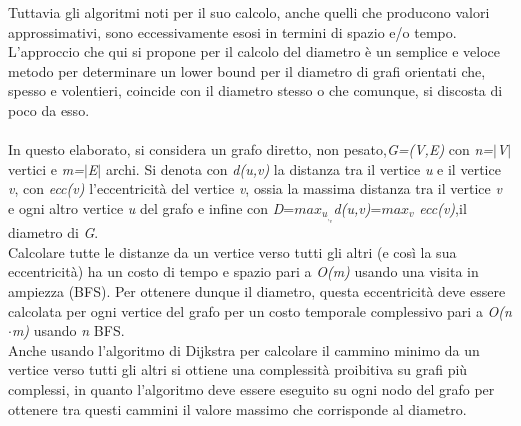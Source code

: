 \documentclass[twoside,openright,titlepage,fleqn,
	headinclude,11pt,a4paper,BCOR5mm,footinclude,pdftex
	]{scrbook}
\begin{document}
Tuttavia gli algoritmi noti per il suo calcolo, anche quelli che producono valori approssimativi, sono eccessivamente esosi in termini di spazio e/o tempo.\\
L'approccio che qui si propone per il calcolo del diametro è un semplice e veloce metodo per determinare un lower bound per il diametro di grafi orientati che, spesso e volentieri, coincide con il diametro stesso o che comunque, si discosta di poco da esso.\\
\\
In questo elaborato, si considera un grafo diretto, non pesato,\textit{G=(V,E)} con \textit{n=$\mid $V$\mid $} vertici  e \textit{m=$\mid$E$\mid$} archi.
Si denota con \textit{d(u,v)} la distanza tra il vertice \textit{u} e il vertice \textit{v}, con \textit{ecc(v)} l'eccentricità del vertice \textit{v}, ossia la massima distanza tra il vertice \textit{v} e ogni altro vertice \textit{u} del grafo e infine con \textit{D}=$max_u_,_v  $\textit{d(u,v)}=$max_v$ \textit{ecc(v)},il diametro di \textit{G}.\\
Calcolare tutte le distanze da un vertice verso tutti gli altri (e così la sua eccentricità) ha un costo di tempo e spazio pari a \textit{O(m)} usando una visita in ampiezza (BFS). Per ottenere dunque il diametro, questa eccentricità deve essere calcolata per ogni vertice del grafo per un costo temporale complessivo pari a \textit{O(n$\cdot $m)} usando \textit{n} BFS.\\Anche usando l'algoritmo di Dijkstra per calcolare il cammino minimo da un vertice verso tutti gli altri si ottiene una complessità proibitiva su grafi più complessi, in quanto l'algoritmo deve essere eseguito su ogni nodo del grafo per ottenere tra questi cammini il valore massimo che corrisponde al diametro.\\
\end{document}
